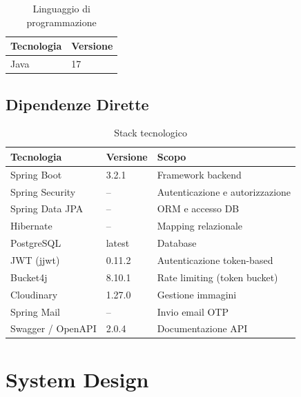 \documentclass[12pt, a4paper]{article}
\begin{document}
    \begin{table}[H]
        \centering
        \begin{tabular}{ll}
            \toprule
            \textbf{Tecnologia} & \textbf{Versione} \\
            \midrule
            Java & 17 \\
            \bottomrule
        \end{tabular}
        \caption{Linguaggio di programmazione}
    \end{table}

    \subsection{Dipendenze Dirette}

    \begin{table}[H]
        \centering
        \begin{tabular}{lll}
            \toprule
            \textbf{Tecnologia} & \textbf{Versione} & \textbf{Scopo} \\
            \midrule
            Spring Boot & 3.2.1 & Framework backend \\
            Spring Security & -- & Autenticazione e autorizzazione \\
            Spring Data JPA & -- & ORM e accesso DB \\
            Hibernate & -- & Mapping relazionale \\
            PostgreSQL & latest & Database \\
            JWT (jjwt) & 0.11.2 & Autenticazione token-based \\
            Bucket4j & 8.10.1 & Rate limiting (token bucket) \\
            Cloudinary & 1.27.0 & Gestione immagini \\
            Spring Mail & -- & Invio email OTP \\
            Swagger / OpenAPI & 2.0.4 & Documentazione API \\
            \bottomrule
        \end{tabular}
        \caption{Stack tecnologico}
    \end{table}
    \section{System Design}
\end{document}
